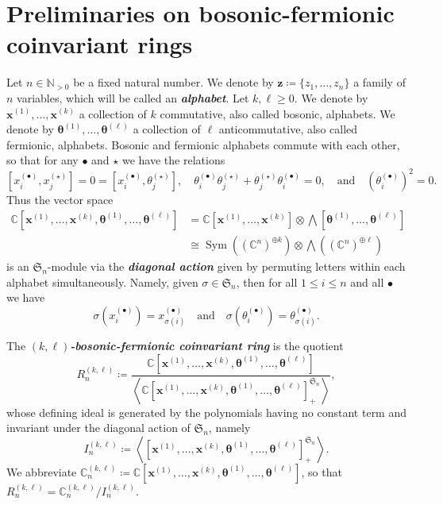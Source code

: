 \documentclass[11pt, reqno]{amsart}
\theoremstyle{definition}
\theoremstyle{remark}
\numberwithin{equation}{section}
\newcommand{\0}{\emptyset}
\newcommand{\C}{\mathbb{C}}
\DeclareMathOperator{\Sym}{Sym}
\newcommand{\newword}[1]{\emph{\textbf{#1}}}
\begin{document}
\section{Preliminaries on bosonic-fermionic coinvariant rings}\label{sec:background}

Let $n \in \mathbb{N}_{>0}$ be a fixed natural number. We denote by 
$\bm{z} \coloneqq \{ z_1, \ldots, z_n \}$ a family of $n$ variables, which 
will be called an \newword{alphabet}. 
Let $k, \ell \geq 0$. We denote by $\bm{x}^{(1)}, \ldots, \bm{x}^{(k)}$ 
a collection of $k$ commutative, also called bosonic, alphabets. 
We denote by $\bm{\theta}^{(1)}, \ldots, \bm{\theta}^{(\ell)}$ 
a collection of $\ell$ anticommutative, also called fermionic, alphabets. 
Bosonic and fermionic alphabets commute with each other, so that for any 
$\bullet$ and $\star$ we have the relations 
\[
    \left[x^{(\bullet)}_i,x^{(\star)}_j\right] 
    = 0 
    = \left[x^{(\bullet)}_i,\theta^{(\star)}_j\right], 
    \quad 
    \theta^{(\bullet)}_i\theta^{(\star)}_j + \theta^{(\star)}_j\theta^{(\bullet)}_i =0, 
    \quad 
    \text{and} 
    \quad 
    \left(\theta^{(\bullet)}_i\right)^2 =0. 
\]
Thus the vector space 
\begin{align*}
    \C\left[\bm{x}^{(1)}, \ldots, \bm{x}^{(k)}, 
    \bm{\theta}^{(1)}, \ldots, \bm{\theta}^{(\ell)}\right] 
    &= \C\left[\bm{x}^{(1)}, \ldots, \bm{x}^{(k)}\right] \otimes 
    \bigwedge\left[\bm{\theta}^{(1)}, \ldots, \bm{\theta}^{(\ell)}\right]\\  
    &\cong \Sym\left(\left(\C^n\right)^{\oplus k}\right) \otimes 
    \bigwedge \left(\left(\C^n\right)^{\oplus \ell}\right) 
\end{align*}
is an $\mathfrak{S}_n$-module via the \newword{diagonal action} given by 
permuting letters within each alphabet simultaneously. 
Namely, given $\sigma \in \mathfrak{S}_n$, then for all $1 \leq i \leq n$ and 
all $\bullet$ we have 
\[
    \sigma(x^{(\bullet)}_i) = x^{(\bullet)}_{\sigma(i)} 
    \quad \text{and} \quad 
    \sigma(\theta^{(\bullet)}_i) = \theta^{(\bullet)}_{\sigma(i)}. 
\]

The \newword{$(k,\ell)$-bosonic-fermionic coinvariant ring} is the quotient 
\begin{equation}
    \label{eq:coinv} 
    R_n^{(k,\ell)} \coloneqq 
    \frac{\C\left[\bm{x}^{(1)}, \ldots, \bm{x}^{(k)}, \bm{\theta}^{(1)}, \ldots, 
    \bm{\theta}^{(\ell)}\right]}{ \left\langle 
    \C\left[\bm{x}^{(1)}, \ldots, \bm{x}^{(k)}, 
    \bm{\theta}^{(1)}, \ldots, \bm{\theta}^{(\ell)}\right]^{\mathfrak{S}_n}_+ \right\rangle },
\end{equation}
whose defining ideal is generated by the polynomials having no constant 
term and invariant under the diagonal action of $\mathfrak{S}_n$, namely 
\[
 I_n^{(k,\ell)} \coloneqq 
\left\langle \left[\bm{x}^{(1)}, \ldots, \bm{x}^{(k)}, \bm{\theta}^{(1)}, \ldots, 
\bm{\theta}^{(\ell)}\right]^{\mathfrak{S}_n}_+
\right\rangle.
\]
We abbreviate $\C_n^{(k,\ell)} \coloneqq 
\C\left[\bm{x}^{(1)},\ldots,\bm{x}^{(k)},\bm{\theta}^{(1)},\ldots,\bm{\theta}^{(\ell)}\right]$, 
so that $R_n^{(k,\ell)} = \C_n^{(k,\ell)} / I_n^{(k,\ell)}$. 
\end{document}
